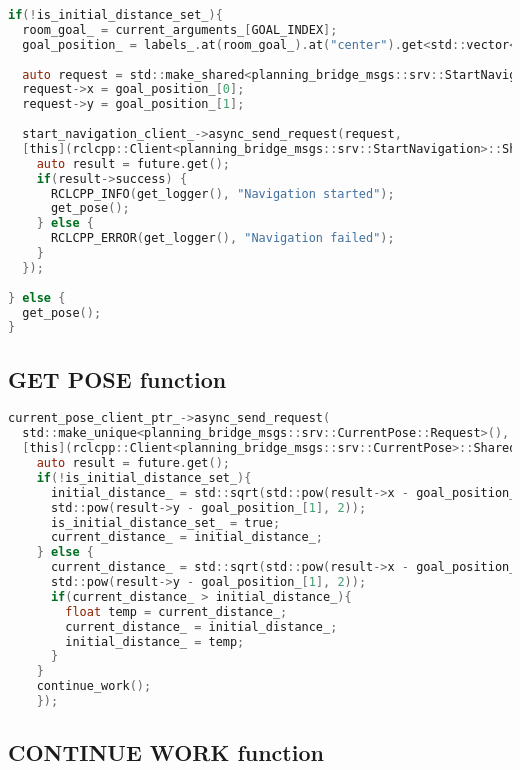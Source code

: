 \noindent\begin{lstlisting}[language=C, style=CStyle, caption={Starts navigation with the given goal coordinates}]
if(!is_initial_distance_set_){
  room_goal_ = current_arguments_[GOAL_INDEX];
  goal_position_ = labels_.at(room_goal_).at("center").get<std::vector<double>>();
  
  auto request = std::make_shared<planning_bridge_msgs::srv::StartNavigation::Request>();
  request->x = goal_position_[0];
  request->y = goal_position_[1];
  
  start_navigation_client_->async_send_request(request,
  [this](rclcpp::Client<planning_bridge_msgs::srv::StartNavigation>::SharedFuture future){
    auto result = future.get();
    if(result->success) {
      RCLCPP_INFO(get_logger(), "Navigation started");
      get_pose();
    } else {
      RCLCPP_ERROR(get_logger(), "Navigation failed");
    }
  });
  
} else {
  get_pose();
}
\end{lstlisting}

\subsection*{GET POSE function}

\noindent\begin{lstlisting}[language=C, style=CStyle, caption={Asks pose and sets initial and current poses}]
current_pose_client_ptr_->async_send_request(
  std::make_unique<planning_bridge_msgs::srv::CurrentPose::Request>(),
  [this](rclcpp::Client<planning_bridge_msgs::srv::CurrentPose>::SharedFuture future) {
    auto result = future.get();
    if(!is_initial_distance_set_){
      initial_distance_ = std::sqrt(std::pow(result->x - goal_position_[0], 2) +
      std::pow(result->y - goal_position_[1], 2));
      is_initial_distance_set_ = true;
      current_distance_ = initial_distance_;
    } else {
      current_distance_ = std::sqrt(std::pow(result->x - goal_position_[0], 2) +
      std::pow(result->y - goal_position_[1], 2));
      if(current_distance_ > initial_distance_){
        float temp = current_distance_;
        current_distance_ = initial_distance_;
        initial_distance_ = temp;
      }
    }
    continue_work();
    });
\end{lstlisting}

\newpage

\subsection*{CONTINUE WORK function}

